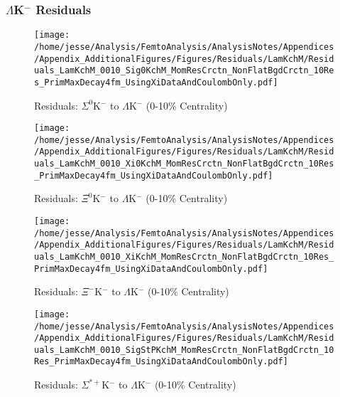 \documentclass[/home/jesse/Analysis/FemtoAnalysis/AnalysisNotes/AnalysisNoteJBuxton.tex]{subfiles}
\begin{document}
\subsubsection{\texorpdfstring{$\Lambda$K$^{-}$}{TEXT} Residuals}
\label{Residuals_LamKchM}

\begin{figure}[h]
  \centering
  \texttt{[image: /home/jesse/Analysis/FemtoAnalysis/AnalysisNotes/Appendices/Appendix\_AdditionalFigures/Figures/Residuals/LamKchM/Residuals\_LamKchM\_0010\_Sig0KchM\_MomResCrctn\_NonFlatBgdCrctn\_10Res\_PrimMaxDecay4fm\_UsingXiDataAndCoulombOnly.pdf]}
  \caption[Residuals: $\Sigma^{0}$K$^{-}$ to $\Lambda$K$^{-}$ (0-10\% Centrality)]{Residuals: $\Sigma^{0}$K$^{-}$ to $\Lambda$K$^{-}$ (0-10\% Centrality)}
  \label{fig:Res_LamKchM_0010_Sig0KchM}
\end{figure}


\begin{figure}[h]
  \centering
  \texttt{[image: /home/jesse/Analysis/FemtoAnalysis/AnalysisNotes/Appendices/Appendix\_AdditionalFigures/Figures/Residuals/LamKchM/Residuals\_LamKchM\_0010\_Xi0KchM\_MomResCrctn\_NonFlatBgdCrctn\_10Res\_PrimMaxDecay4fm\_UsingXiDataAndCoulombOnly.pdf]}
  \caption[Residuals: $\Xi^{0}$K$^{-}$ to $\Lambda$K$^{-}$ (0-10\% Centrality)]{Residuals: $\Xi^{0}$K$^{-}$ to $\Lambda$K$^{-}$ (0-10\% Centrality)}
  \label{fig:Res_LamKchM_0010_Xi0KchM}
\end{figure}


\begin{figure}[h]
  \centering
  \texttt{[image: /home/jesse/Analysis/FemtoAnalysis/AnalysisNotes/Appendices/Appendix\_AdditionalFigures/Figures/Residuals/LamKchM/Residuals\_LamKchM\_0010\_XiKchM\_MomResCrctn\_NonFlatBgdCrctn\_10Res\_PrimMaxDecay4fm\_UsingXiDataAndCoulombOnly.pdf]}
  \caption[Residuals: $\Xi^{-}$K$^{-}$ to $\Lambda$K$^{-}$ (0-10\% Centrality)]{Residuals: $\Xi^{-}$K$^{-}$ to $\Lambda$K$^{-}$ (0-10\% Centrality)}
  \label{fig:Res_LamKchM_0010_XiCKchM}
\end{figure}


\begin{figure}[h]
  \centering
  \texttt{[image: /home/jesse/Analysis/FemtoAnalysis/AnalysisNotes/Appendices/Appendix\_AdditionalFigures/Figures/Residuals/LamKchM/Residuals\_LamKchM\_0010\_SigStPKchM\_MomResCrctn\_NonFlatBgdCrctn\_10Res\_PrimMaxDecay4fm\_UsingXiDataAndCoulombOnly.pdf]}
  \caption[Residuals: $\Sigma^{*+}$K$^{-}$ to $\Lambda$K$^{-}$ (0-10\% Centrality)]{Residuals: $\Sigma^{*+}$K$^{-}$ to $\Lambda$K$^{-}$ (0-10\% Centrality)}
  \label{fig:Res_LamKchM_0010_SigStPKchM}
\end{figure}
\end{document}
